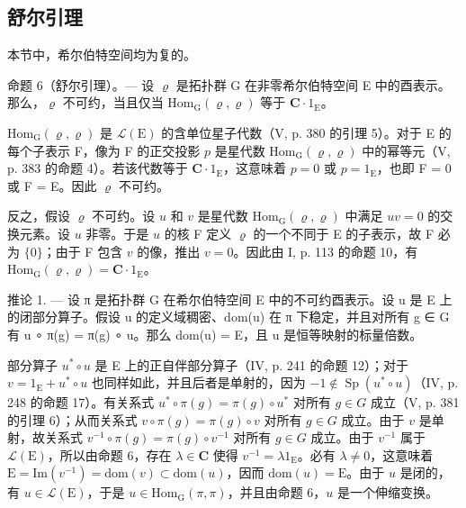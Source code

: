 \subsection{舒尔引理}

本节中，希尔伯特空间均为复的。

命题 6（舒尔引理）。--- 设 \(\varrho\) 是拓扑群 G 在非零希尔伯特空间 E 中的酉表示。那么，\(\varrho\) 不可约，当且仅当 \(\mathrm{Hom}_{\mathrm{G}}(\varrho, \varrho)\) 等于 \(\mathbf{C} \cdot 1_{\mathrm{E}}\)。

\(\mathrm{Hom}_{\mathrm{G}}(\varrho, \varrho)\) 是 \(\mathcal{L}(\mathrm{E})\) 的含单位星子代数（V, p. 380 的引理 5）。对于 E 的每个子表示 F，像为 F 的正交投影 \(p\) 是星代数 \(\mathrm{Hom}_{\mathrm{G}}(\varrho, \varrho)\) 中的幂等元（V, p. 383 的命题 4）。若该代数等于 \(\mathbf{C} \cdot 1_{\mathrm{E}}\)，这意味着 \(p = 0\) 或 \(p = 1_{\mathrm{E}}\)，也即 F = 0 或 F = E。因此 \(\varrho\) 不可约。

反之，假设 \(\varrho\) 不可约。设 \(u\) 和 \(v\) 是星代数 \(\mathrm{Hom}_{\mathrm{G}}(\varrho, \varrho)\) 中满足 \(uv = 0\) 的交换元素。设 \(u\) 非零。于是 \(u\) 的核 F 定义 \(\varrho\) 的一个不同于 E 的子表示，故 F 必为 \(\{0\}\)；由于 F 包含 \(v\) 的像，推出 \(v = 0\)。因此由 I, p. 113 的命题 10，有 \(\mathrm{Hom}_{\mathrm{G}}(\varrho, \varrho) = \mathbf{C} \cdot 1_{\mathrm{E}}\)。

推论 1. --- 设 π 是拓扑群 G 在希尔伯特空间 E 中的不可约酉表示。设 u 是 E 上的闭部分算子。假设 u 的定义域稠密、dom(u) 在 π 下稳定，并且对所有 g ∈ G 有 u ∘ π(g) = π(g) ∘ u。那么 dom(u) = E，且 u 是恒等映射的标量倍数。

部分算子 \(u^{*} \circ u\) 是 E 上的正自伴部分算子（IV, p. 241 的命题 12）；对于 \(v = 1_{\mathrm{E}} + u^{*} \circ u\) 也同样如此，并且后者是单射的，因为 \(-1 \notin \operatorname{Sp}(u^{*} \circ u)\)（IV, p. 248 的命题 17）。有关系式 \(u^{*} \circ \pi(g) = \pi(g) \circ u^{*}\) 对所有 \(g \in G\) 成立（V, p. 381 的引理 6）；从而关系式 \(v \circ \pi(g) = \pi(g) \circ v\) 对所有 \(g \in G\) 成立。由于 \(v\) 是单射，故关系式 \(v^{-1} \circ \pi(g) = \pi(g) \circ v^{-1}\) 对所有 \(g \in G\) 成立。由于 \(v^{-1}\) 属于 \(\mathcal{L}(\mathrm{E})\)，所以由命题 6，存在 \(\lambda \in \mathbf{C}\) 使得 \(v^{-1} = \lambda 1_{\mathrm{E}}\)。必有 \(\lambda \neq 0\)，这意味着 \(\mathrm{E} = \mathrm{Im}(v^{-1}) = \mathrm{dom}(v) \subset \mathrm{dom}(u)\)，因而 \(\mathrm{dom}(u) = \mathrm{E}\)。由于 \(u\) 是闭的，有 \(u \in \mathcal{L}(\mathrm{E})\)，于是 \(u \in \mathrm{Hom}_{\mathrm{G}}(\pi, \pi)\)，并且由命题 6，\(u\) 是一个伸缩变换。

